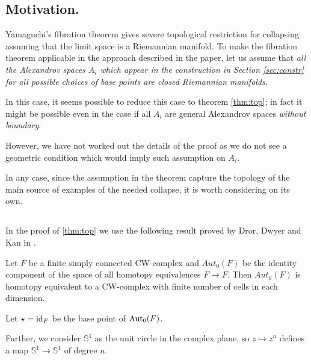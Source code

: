 \documentclass{amsart}
\begin{document}
\subsection{Motivation.} Yamaguchi's fibration theorem gives severe topological restriction for collapsing assuming that the limit space is a Riemannian manifold.
To make the fibration theorem applicable in the approach described in the paper,
let us assume that \emph{all the Alexandrov spaces $A_i$ which appear in the construction in  Section \ref{sec:constr} for all possible choices of base points are closed Riemannian manifolds}.

In this case, it seems possible to reduce this case to  theorem \ref{thm:top};
in fact it might  be possible even in the case if all $A_i$ are general  Alexandrov spaces  \emph{without  boundary}.
{\color{red}However, we have not worked out the details of the proof as we do not see a  geometric condition which would imply such assumption on $A_i$.%

In any case, since  the assumption in the theorem  capture the topology of the main source of examples of the needed collapse, it is worth considering on its own.}


\subsection{}
In the proof of \ref{thm:top} we use the following result proved by Dror,  Dwyer and Kan in \cite{DDK}.

\begin{thm}\label{thm:DDK}
Let $F$ be a finite simply connected CW-complex and 
$Aut_0(F)$ be the identity component  of the 
space of all homotopy equivalences $F\to F$. Then $Aut_0(F)$ is homotopy equivalent to a CW-complex with finite number of cells in each dimension.
\end{thm}

Let $\star=\operatorname{\rm id}_F$ be the base point of $\operatorname{\rm Aut}_0(F)$.

Further, we consider $\mathbb{S}^1$ as the unit circle in the complex plane, so  $z\mapsto z^n$ defines a map $\mathbb{S}^1\to \mathbb{S}^1$ of degree $n$.
\end{document}
